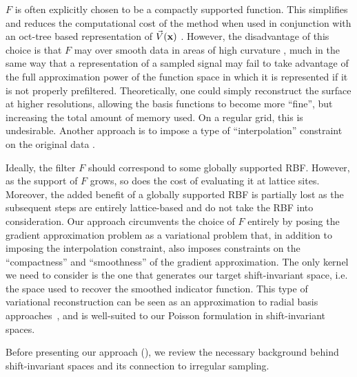 $F$ is often explicitly chosen to be a compactly supported function. This simplifies and reduces the computational cost of the method when used in conjunction with an oct-tree based representation of $\vec{V}(\mathbf{x})$ \cite{Kazhdan06}. However, the  disadvantage of this choice is that $F$ may over smooth data in areas of high curvature \cite{reconbench}, much in the same way that a representation of a sampled signal may fail to take advantage of the full approximation power of the function space in which it is represented if it is not properly prefiltered. Theoretically, one could simply reconstruct the surface at higher resolutions, allowing the basis functions to become more ``fine'', but increasing the total amount of memory used. On a regular grid, this is undesirable. Another approach is to impose a type of ``interpolation'' constraint on the original data \cite{screenedk} .

Ideally, the filter $F$ should correspond to some globally supported RBF. However, as the support of $F$ grows, so does the cost of evaluating it at lattice sites. Moreover, the added benefit of a globally supported RBF is partially lost as the subsequent steps are entirely lattice-based and do not take the RBF into consideration. Our approach circumvents the choice of $F$ entirely by posing the gradient approximation problem as a variational problem that, in addition to imposing the interpolation constraint, also imposes constraints on the ``compactness'' and ``smoothness'' of the gradient approximation. The only kernel we need to consider is the one that generates our target shift-invariant space, i.e. the space used to recover the smoothed indicator function. This type of variational reconstruction can be seen as an approximation to radial basis approaches~\cite{variational}, and is well-suited to our Poisson formulation in shift-invariant spaces.

Before presenting our approach (), we review the necessary background behind shift-invariant spaces and its connection to irregular sampling.

